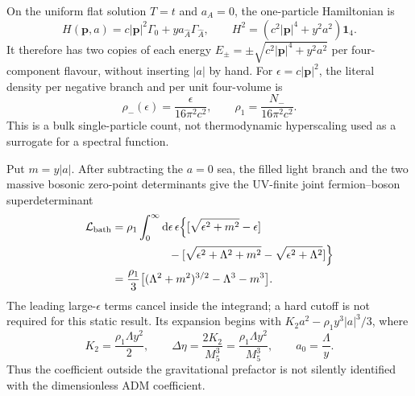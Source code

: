 \documentclass[10pt]{article}
\newcommand{\dd}{\mathrm{d}}
\begin{document}
On the uniform flat solution $T=t$ and $a_A=0$, the one-particle Hamiltonian is
\begin{equation}
 H(\mathbf p,a)=c|\mathbf p|^2\Gamma_0+y a_{\hat A}\Gamma_{\hat A},
 \qquad H^2=(c^2|\mathbf p|^4+y^2a^2)\mathbf 1_4 .
 \label{eq:z2cliffordspectrum}
\end{equation}
It therefore has two copies of each energy
$E_\pm=\pm\sqrt{c^2|\mathbf p|^4+y^2a^2}$ per four-component flavour, without
inserting $|a|$ by hand.  For $\epsilon=c|\mathbf p|^2$, the literal density per
negative branch and per unit four-volume is
\begin{equation}
 \rho_-(\epsilon)=\frac{\epsilon}{16\pi^2c^2},\qquad
 \rho_1=\frac{N_-}{16\pi^2c^2}.
 \label{eq:z2lineardos}
\end{equation}
This is a bulk single-particle count, not thermodynamic hyperscaling used as a
surrogate for a spectral function.

Put $m=y|a|$.  After subtracting the $a=0$ sea, the filled light branch and the
two massive bosonic zero-point determinants give the UV-finite joint
fermion--boson superdeterminant
\begin{equation}
 \begin{split}
 {\cal L}_{\rm bath}={}&\rho_1\int_0^\infty\dd\epsilon\,\epsilon
 \Bigl\{[\sqrt{\epsilon^2+m^2}-\epsilon]\\
 &\hspace{3.7em}-[\sqrt{\epsilon^2+\Lambda^2+m^2}
                 -\sqrt{\epsilon^2+\Lambda^2}]\Bigr\}\\
 ={}&\frac{\rho_1}{3}\bigl[(\Lambda^2+m^2)^{3/2}
                       -\Lambda^3-m^3\bigr].
 \end{split}
 \label{eq:z2superdeterminant}
\end{equation}
The leading large-$\epsilon$ terms cancel inside the integrand; a hard cutoff is
not required for this static result.  Its expansion begins with
$K_2a^2-\rho_1y^3|a|^3/3$, where
\begin{equation}
 K_2=\frac{\rho_1\Lambda y^2}{2},\qquad
 \Delta\eta=\frac{2K_2}{M_5^3}
            =\frac{\rho_1\Lambda y^2}{M_5^3},\qquad
 a_0=\frac{\Lambda}{y}.
 \label{eq:z2plancknormalization}
\end{equation}
Thus the coefficient outside the gravitational prefactor is not silently
identified with the dimensionless ADM coefficient.
\end{document}
